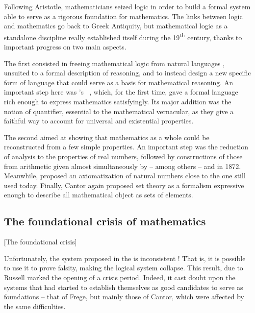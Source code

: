 Following Aristotle, mathematicians seized logic in order to build a formal system
able to serve as a rigorous foundation for mathematics.
The links between logic and mathematics go back to Greek Antiquity, but
mathematical logic as a standalone discipline really established itself
during the 19\textsuperscript{th} century, thanks to important progress on two main aspects.

The first consisted in freeing mathematical logic from natural languages%
,
unsuited to a formal description of reasoning, and to instead design a new specific
form of language that could serve as a basis for mathematical reasoning.
An important step here was \citeauthor{Begriffsschrift}'s
~, which, for the first time,
gave a formal language rich enough to express mathematics satisfyingly. Its
major addition was the notion of quantifier, essential to the mathematical vernacular,
as they give a faithful way to account for universal%
and existential%
properties.

The second aimed at showing that mathematics as a whole could be reconstructed from a
few simple properties. An important step was the reduction of analysis to the properties
of real numbers, followed by constructions of those from arithmetic given almost
simultaneously by – among others –  and
 in 1872.
Meanwhile,  proposed an axiomatization of natural numbers close to the
one still used today. Finally, Cantor again proposed set theory 
as a formalism expressive enough to describe all mathematical object as sets of elements.

\subsection{The foundational crisis of mathematics}[The foundational crisis]

Unfortunately, the system proposed in the  is inconsistent !
That is, it is possible to use it to prove falsity, 
making the logical system collapse.%
This result, due to Russell%
%
marked the opening of a crisis period.
Indeed, it cast doubt upon the systems that had started to establish
themselves as good candidates to serve as foundations – that of Frege, but
mainly those of Cantor, which were affected by the same difficulties.

